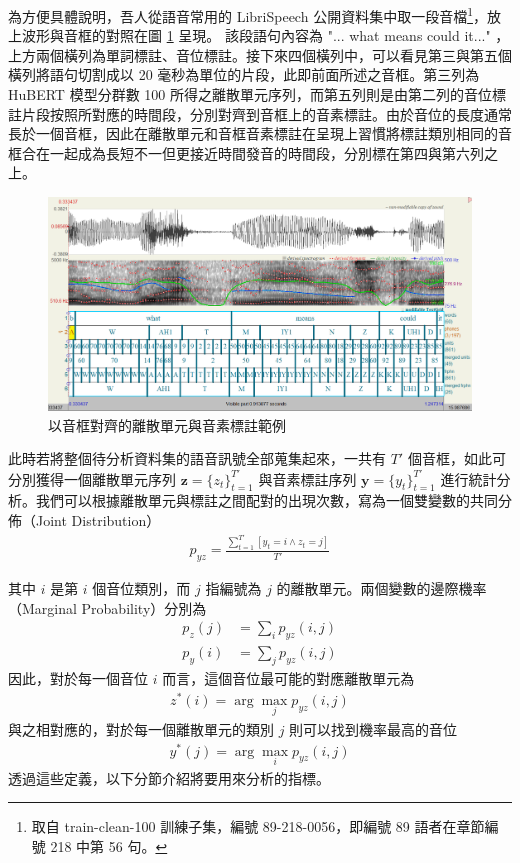 {        為方便具體說明，吾人從語音常用的 LibriSpeech \cite{panayotov_librispeech_2015} 公開資料集中取一段音檔\footnote{取自 train-clean-100 訓練子集，編號 89-218-0056，即編號 89 語者在章節編號 218 中第 56 句。}，放上波形與音框的對照在圖 \ref{fig:enter-labelwav} 呈現。 該段語句內容為 "... what means could it..." ，上方兩個橫列為單詞標註、音位標註。接下來四個橫列中，可以看見第三與第五個橫列將語句切割成以 20 毫秒為單位的片段，此即前面所述之音框。第三列為 HuBERT 模型分群數 100 所得之離散單元序列，而第五列則是由第二列的音位標註片段按照所對應的時間段，分別對齊到音框上的音素標註。由於音位的長度通常長於一個音框，因此在離散單元和音框音素標註在呈現上習慣將標註類別相同的音框合在一起成為長短不一但更接近時間發音的時間段，分別標在第四與第六列之上。
        \begin{figure}
            \centering
            \includegraphics[width=1\linewidth]{figures/praat.png}
            \caption{以音框對齊的離散單元與音素標註範例}
            \label{fig:enter-labelwav}
        \end{figure}
        
        此時若將整個待分析資料集的語音訊號全部蒐集起來，一共有 $T'$ 個音框，如此可分別獲得一個離散單元序列 $\boldsymbol{z} = \{z_t\}_{t=1}^{T'}$ 與音素標註序列 $\boldsymbol{y} = \{y_t\}_{t=1}^{T'}$ 進行統計分析。我們可以根據離散單元與標註之間配對的出現次數，寫為一個雙變數的共同分佈（Joint Distribution）
\begin{align}
    p_{yz} = \frac{\sum^{T'}_{t=1}[{y_t = i \wedge z_t = j}]}{T'}
\end{align}

其中 $i$ 是第 $i$ 個音位類別，而 $j$ 指編號為 $j$ 的離散單元。兩個變數的邊際機率（Marginal Probability）分別為
\begin{align}
    p_z(j) & =\sum_i{p_{yz}(i, j)} \\
    p_y(i) & =\sum_j{p_{yz}(i, j)}
\end{align}
因此，對於每一個音位 $i$ 而言，這個音位最可能的對應離散單元為
\begin{align}
    z^\ast(i) = \arg\max_j p_{yz}(i, j)
\end{align}
與之相對應的，對於每一個離散單元的類別 $j$ 則可以找到機率最高的音位
\begin{align}
    y^\ast(j) = \arg\max_i p_{yz}(i,j)
\end{align}
透過這些定義，以下分節介紹將要用來分析的指標。

}
